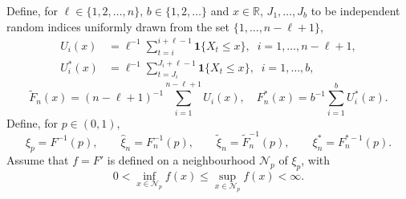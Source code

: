 \documentclass[a4paper, 12pt]{article}
\theoremstyle{plain}
\theoremstyle{definition}
\begin{document}
Define, for $\ell\in\{1,2,\ldots,n\}$, $b\in\{1,2,\ldots\}$ and $x\in\mathbb{R}$,
$J_1,\ldots,J_b$ to be independent random indices uniformly drawn from the
set $\{1,\ldots,n-\ell+1\}$,
\begin{align*}
U_i(x)&=\ell^{-1}\sum_{t=i}^{i+\ell-1}\pmb{1}\{X_t\le x\},\;\;
i=1,\ldots,n-\ell+1,\\
U^*_i(x)&=\ell^{-1}\sum_{t=J_i}^{J_i+\ell-1}\pmb{1}\{X_{t}\le x\},\;\;
i=1,\ldots,b,
\end{align*}
\begin{equation*}
    \tilde{F}_n(x)=(n-\ell+1)^{-1}\sum_{i=1}^{n-\ell+1}U_i(x), \quad F^*_n(x)=b^{-1}\sum_{i=1}^bU^*_i(x).
\end{equation*}
Define, for $p\in(0,1)$,
\[ \xi_p=F^{-1}(p),\qquad\hat\xi_n=F_n^{-1}(p),\qquad\tilde\xi_n=\tilde{F}_n^{-1}(p),
\qquad\xi^*_n=F^{*-1}_n(p).\]
Assume that $f=F'$ is defined on a neighbourhood $\mathscr{N}_p$ of $\xi_p$,  with
\[0<\underset{x\in\mathscr{N}_p}\inf f(x)\le \underset{x\in\mathscr{N}_p}\sup f(x)<\infty.\]
\end{document}
